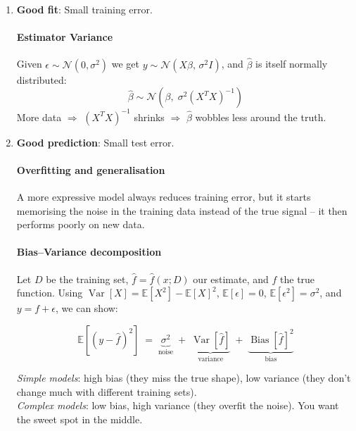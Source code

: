 \documentclass{article}
\begin{document}
\begin{enumerate}

  \item \textbf{Good fit}: Small training error.

  \paragraph{Estimator Variance}
  Given $\epsilon \sim \mathcal{N}(0,\sigma^2)$ we get
  $y \sim \mathcal{N}(X\beta,\,\sigma^2 I)$, and $\hat{\beta}$ is itself
  normally distributed:
  \[
      \hat{\beta} \sim \mathcal{N}\!\left(\beta,\;\sigma^2(X^TX)^{-1}\right)
  \]
  More data $\Rightarrow$ $(X^TX)^{-1}$ shrinks $\Rightarrow$ $\hat{\beta}$
  wobbles less around the truth.

  \item \textbf{Good prediction}: Small test error.

  \paragraph{Overfitting and generalisation}
  A more expressive model always reduces training error, but it starts memorising
  the noise in the training data instead of the true signal -- it then performs
  poorly on new data.

  \paragraph{Bias--Variance decomposition}
  Let $D$ be the training set, $\hat{f}=\hat{f}(x;D)$ our estimate, and
  $f$ the true function. Using
  $\operatorname{Var}[X] = \mathbb{E}[X^2] - \mathbb{E}[X]^2$,
  $\mathbb{E}[\epsilon]=0$, $\mathbb{E}[\epsilon^2]=\sigma^2$, and
  $y = f + \epsilon$, we can show:

  \[
      \mathbb{E}\!\left[(y - \hat{f})^2\right]
      \;=\;
      \underbrace{\sigma^2}_{\text{noise}}
      \;+\;
      \underbrace{\operatorname{Var}[\hat{f}]}_{\text{variance}}
      \;+\;
      \underbrace{\operatorname{Bias}[\hat{f}]^2}_{\text{bias}}
  \]

  \textit{Simple models}: high bias (they miss the true shape), low variance
  (they don't change much with different training sets).\\
  \textit{Complex models}: low bias, high variance (they overfit the noise).
  You want the sweet spot in the middle.


\end{enumerate}
\end{document}
